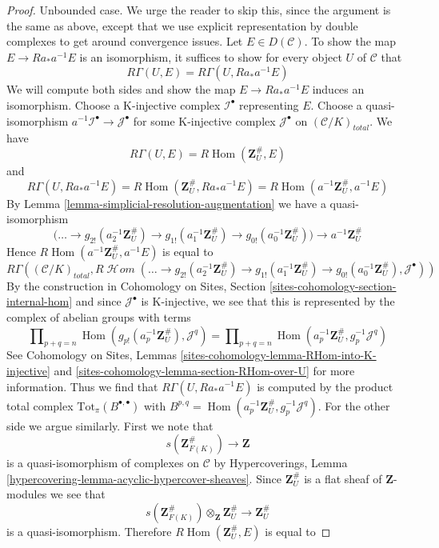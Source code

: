 \documentclass{stacks-project}
\theoremstyle{plain}
\theoremstyle{definition}
\theoremstyle{remark}
\numberwithin{equation}{subsection}
\def\Hom{\mathop{\mathrm{Hom}}\nolimits}
\def\SheafHom{\mathop{\mathcal{H}\!\mathit{om}}\nolimits}
\begin{document}
\begin{proof}
\medskip\noindent
Unbounded case. We urge the reader to skip this, since the argument
is the same as above, except that we use explicit representation
by double complexes to get around convergence issues.
Let $E \in D(\mathcal{C})$.
To show the map $E \to Ra_*a^{-1}E$ is an isomorphism,
it suffices to show for every object $U$ of $\mathcal{C}$ that
$$
R\Gamma(U, E) = R\Gamma(U, Ra_*a^{-1}E)
$$
We will compute both sides and show the map $E \to Ra_*a^{-1}E$
induces an isomorphism. Choose a K-injective
complex $\mathcal{I}^\bullet$ representing $E$. Choose a quasi-isomorphism
$a^{-1}\mathcal{I}^\bullet \to \mathcal{J}^\bullet$
for some K-injective complex $\mathcal{J}^\bullet$ on
$(\mathcal{C}/K)_{total}$. We have
$$
R\Gamma(U, E) = R\Hom(\mathbf{Z}_U^\#, E)
$$
and
$$
R\Gamma(U, Ra_*a^{-1}E) = R\Hom(\mathbf{Z}_U^\#, Ra_*a^{-1}E) =
R\Hom(a^{-1}\mathbf{Z}_U^\#, a^{-1}E)
$$
By Lemma \ref{lemma-simplicial-resolution-augmentation}
we have a quasi-isomorphism
$$
\Big(\ldots \to
g_{2!}(a_2^{-1}\mathbf{Z}_U^\#) \to
g_{1!}(a_1^{-1}\mathbf{Z}_U^\#) \to
g_{0!}(a_0^{-1}\mathbf{Z}_U^\#)\Big)
\longrightarrow
a^{-1}\mathbf{Z}_U^\#
$$
Hence $R\Hom(a^{-1}\mathbf{Z}_U^\#, a^{-1}E)$ is equal to
$$
R\Gamma((\mathcal{C}/K)_{total},
R\SheafHom(
\ldots \to
g_{2!}(a_2^{-1}\mathbf{Z}_U^\#) \to
g_{1!}(a_1^{-1}\mathbf{Z}_U^\#) \to
g_{0!}(a_0^{-1}\mathbf{Z}_U^\#),
\mathcal{J}^\bullet))
$$
By the construction in Cohomology on Sites, Section
\ref{sites-cohomology-section-internal-hom}
and since $\mathcal{J}^\bullet$ is K-injective, we see that
this is represented by the complex of abelian groups with terms
$$
\prod\nolimits_{p + q = n}
\Hom(g_{p!}(a_p^{-1}\mathbf{Z}_U^\#), \mathcal{J}^q) =
\prod\nolimits_{p + q = n}
\Hom(a_p^{-1}\mathbf{Z}_U^\#, g_p^{-1}\mathcal{J}^q)
$$
See Cohomology on Sites, Lemmas
\ref{sites-cohomology-lemma-RHom-into-K-injective} and
\ref{sites-cohomology-lemma-section-RHom-over-U} for more information.
Thus we find that $R\Gamma(U, Ra_*a^{-1}E)$ is computed by
the product total complex $\text{Tot}_\pi(B^{\bullet, \bullet})$
with $B^{p, q} = \Hom(a_p^{-1}\mathbf{Z}_U^\#, g_p^{-1}\mathcal{J}^q)$.
For the other side we argue similarly. First we note that
$$
s(\mathbf{Z}_{F(K)}^\#) \longrightarrow \mathbf{Z}
$$
is a quasi-isomorphism of complexes on $\mathcal{C}$
by Hypercoverings, Lemma \ref{hypercovering-lemma-acyclic-hypercover-sheaves}.
Since $\mathbf{Z}_U^\#$ is a flat sheaf of $\mathbf{Z}$-modules
we see that
$$
s(\mathbf{Z}_{F(K)}^\#) \otimes_\mathbf{Z} \mathbf{Z}_U^\#
\longrightarrow
\mathbf{Z}_U^\#
$$
is a quasi-isomorphism. Therefore
$R\Hom(\mathbf{Z}_U^\#, E)$ is equal to

\end{proof}
\end{document}
